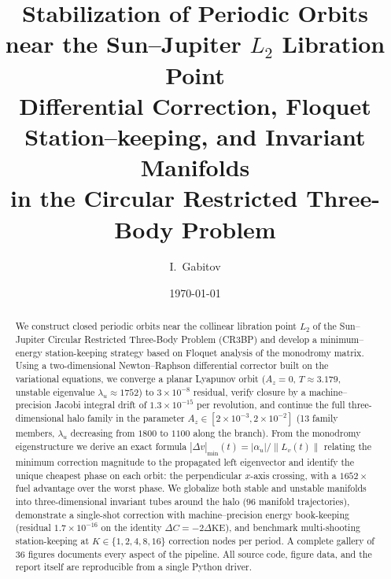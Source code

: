 \documentclass[11pt,a4paper]{article}
\title{\vspace{-1.5cm}
\textbf{Stabilization of Periodic Orbits near the Sun--Jupiter $L_2$ Libration Point} \\
\large Differential Correction, Floquet Station--keeping, and Invariant Manifolds \\
in the Circular Restricted Three-Body Problem}
\author{I.~Gabitov}
\date{\today}
\begin{document}
\maketitle
\thispagestyle{fancy}

\begin{center}
\end{center}
\vspace{0.4cm}

\begin{abstract}
We construct closed periodic orbits near the collinear libration point $L_2$ of the Sun--Jupiter Circular Restricted Three-Body Problem (CR3BP) and develop a minimum--energy station-keeping strategy based on Floquet analysis of the monodromy matrix. Using a two-dimensional Newton--Raphson differential corrector built on the variational equations, we converge a planar Lyapunov orbit ($A_z = 0$, $T \approx 3.179$, unstable eigenvalue $\lambda_u \approx 1752$) to $3\times 10^{-8}$ residual, verify closure by a machine--precision Jacobi integral drift of $1.3\times 10^{-15}$ per revolution, and continue the full three-dimensional halo family in the parameter $A_z \in [2\times 10^{-3}, 2\times 10^{-2}]$ (13 family members, $\lambda_u$ decreasing from $1800$ to $1100$ along the branch). From the monodromy eigenstructure we derive an exact formula $|\Delta v|_{\min}(t) = |\alpha_u|/\|L_v(t)\|$ relating the minimum correction magnitude to the propagated left eigenvector and identify the unique cheapest phase on each orbit: the perpendicular $x$-axis crossing, with a $1652\times$ fuel advantage over the worst phase. We globalize both stable and unstable manifolds into three-dimensional invariant tubes around the halo ($96$ manifold trajectories), demonstrate a single-shot correction with machine--precision energy book-keeping (residual $1.7\times 10^{-16}$ on the identity $\Delta C = -2\Delta\mathrm{KE}$), and benchmark multi-shooting station-keeping at $K \in \{1,2,4,8,16\}$ correction nodes per period. A complete gallery of 36 figures documents every aspect of the pipeline. All source code, figure data, and the report itself are reproducible from a single Python driver.
\end{abstract}
\end{document}
